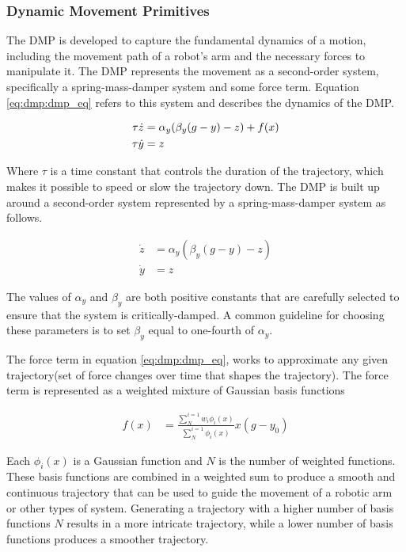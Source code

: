 \subsubsection{Dynamic Movement Primitives}\label{sec::DMP}
The DMP \cite{SelfStudy} is developed to capture the fundamental dynamics of a motion, including the movement path of a robot's arm and the necessary forces to manipulate it. The DMP represents the movement as a second-order system, specifically a spring-mass-damper system and some force term. Equation \ref{eq:dmp:dmp_eq} refers to this system and describes the dynamics of the DMP.

\begin{align}
    \tau \Dot{z} &= \alpha_y(\beta_y(g-y) - z) + f(x) \notag \\
    \tau \Dot{y} &= z
    \label{eq:dmp:dmp_eq}
\end{align}

Where $\tau$ is a time constant that controls the duration of the trajectory, which makes it possible to speed or slow the trajectory down.
The DMP is built up around a second-order system represented by a spring-mass-damper system as follows. 

\begin{align*}
    \Dot{z} &= \alpha_y(\beta_y(g-y) - z)\\
    \Dot{y} &= z
\end{align*}

The values of $ \alpha_y $ and $ \beta_y$ are both positive constants that are carefully selected to ensure that the system is critically-damped. A common guideline for choosing these parameters is to set $ \beta_y$ equal to one-fourth of $ \alpha_y $.

The force term in equation \ref{eq:dmp:dmp_eq}, works to approximate any given trajectory(set of force changes over time that shapes the trajectory). The force term is represented as a weighted mixture of Gaussian basis functions

\begin{align}
    f(x) &= \frac{\sum_N^{i=1} w_i \phi_i(x)}{\sum_N^{i=1} \phi_i(x)} x(g-y_0)
    \label{eq:dmo:force_func}
\end{align}

Each $\phi_i(x)$ is a Gaussian function and $N$ is the number of weighted functions. These basis functions are combined in a weighted sum to produce a smooth and continuous trajectory that can be used to guide the movement of a robotic arm or other types of system. Generating a trajectory with a higher number of basis functions $N$ results in a more intricate trajectory, while a lower number of basis functions produces a smoother trajectory. 

